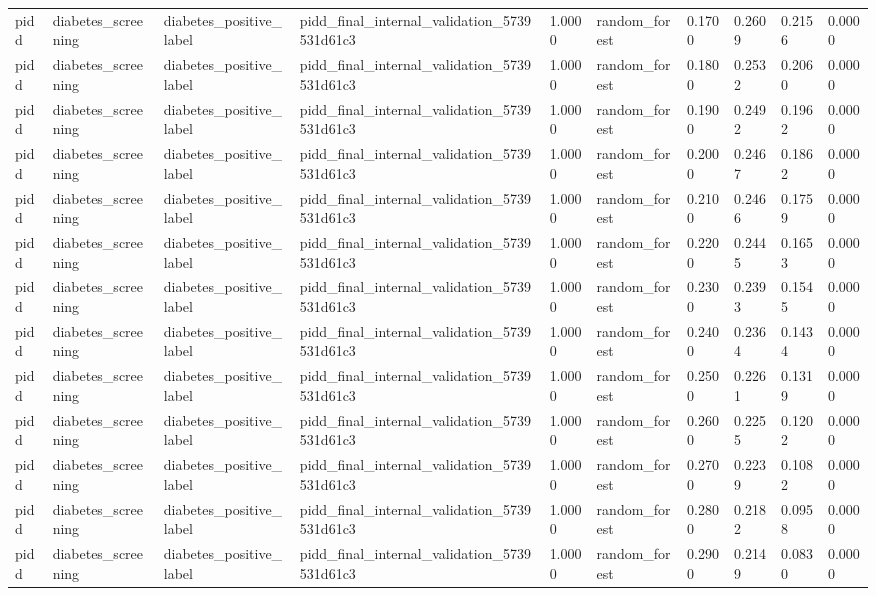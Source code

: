 \begin{tabular}{llllllllll}
pidd & diabetes\_screening & diabetes\_positive\_label & pidd\_final\_internal\_validation\_5739531d61c3 & 1.0000 & random\_forest & 0.1700 & 0.2609 & 0.2156 & 0.0000 \\
pidd & diabetes\_screening & diabetes\_positive\_label & pidd\_final\_internal\_validation\_5739531d61c3 & 1.0000 & random\_forest & 0.1800 & 0.2532 & 0.2060 & 0.0000 \\
pidd & diabetes\_screening & diabetes\_positive\_label & pidd\_final\_internal\_validation\_5739531d61c3 & 1.0000 & random\_forest & 0.1900 & 0.2492 & 0.1962 & 0.0000 \\
pidd & diabetes\_screening & diabetes\_positive\_label & pidd\_final\_internal\_validation\_5739531d61c3 & 1.0000 & random\_forest & 0.2000 & 0.2467 & 0.1862 & 0.0000 \\
pidd & diabetes\_screening & diabetes\_positive\_label & pidd\_final\_internal\_validation\_5739531d61c3 & 1.0000 & random\_forest & 0.2100 & 0.2466 & 0.1759 & 0.0000 \\
pidd & diabetes\_screening & diabetes\_positive\_label & pidd\_final\_internal\_validation\_5739531d61c3 & 1.0000 & random\_forest & 0.2200 & 0.2445 & 0.1653 & 0.0000 \\
pidd & diabetes\_screening & diabetes\_positive\_label & pidd\_final\_internal\_validation\_5739531d61c3 & 1.0000 & random\_forest & 0.2300 & 0.2393 & 0.1545 & 0.0000 \\
pidd & diabetes\_screening & diabetes\_positive\_label & pidd\_final\_internal\_validation\_5739531d61c3 & 1.0000 & random\_forest & 0.2400 & 0.2364 & 0.1434 & 0.0000 \\
pidd & diabetes\_screening & diabetes\_positive\_label & pidd\_final\_internal\_validation\_5739531d61c3 & 1.0000 & random\_forest & 0.2500 & 0.2261 & 0.1319 & 0.0000 \\
pidd & diabetes\_screening & diabetes\_positive\_label & pidd\_final\_internal\_validation\_5739531d61c3 & 1.0000 & random\_forest & 0.2600 & 0.2255 & 0.1202 & 0.0000 \\
pidd & diabetes\_screening & diabetes\_positive\_label & pidd\_final\_internal\_validation\_5739531d61c3 & 1.0000 & random\_forest & 0.2700 & 0.2239 & 0.1082 & 0.0000 \\
pidd & diabetes\_screening & diabetes\_positive\_label & pidd\_final\_internal\_validation\_5739531d61c3 & 1.0000 & random\_forest & 0.2800 & 0.2182 & 0.0958 & 0.0000 \\
pidd & diabetes\_screening & diabetes\_positive\_label & pidd\_final\_internal\_validation\_5739531d61c3 & 1.0000 & random\_forest & 0.2900 & 0.2149 & 0.0830 & 0.0000 \\

\end{tabular}
